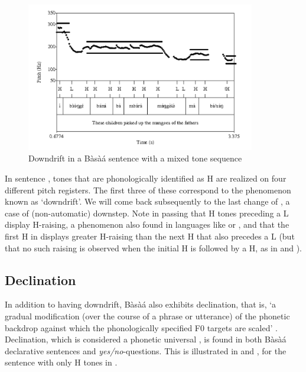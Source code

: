 \documentclass[output=paper,newtxmath,modfonts,nonflat]{langsci/langscibook}
\begin{document}
\begin{figure} 
\includegraphics[width=10cm]{figures/Downdrift}
\caption{Downdrift in a Bàsà{á} sentence with a mixed tone sequence \citep{MakassoEtAl17} \label{fig:HamlaouiMakasso:2}} 
\end{figure}

\noindent In sentence , tones that are phonologically identified as H are realized on four different pitch registers. The first three of these correspond to the phenomenon known as `downdrift'. We will come back subsequently to the last change of , a case of (non-automatic) downstep. Note in passing that H tones preceding a L  display H-raising, a phenomenon also found in languages like  \citep[a.o.][]{ConnellLadd90, Laniran92, LaniranClements03} or  \citep{RiallandSome00, Rialland01}, and that the first H in  displays greater H-raising than the next H that also precedes a L (but that no such raising is observed when the initial H is followed by a H, as in  and ).  


\subsection{Declination}

In addition to having downdrift, Bàsà{á} also exhibits declination, that is, `a gradual modification (over the course of a phrase or utterance) of the phonetic backdrop against which the phonologically specified F$0$ targets are scaled' \citep{ConnellLadd90, Connell11}. Declination, which is considered a phonetic universal \citep{Ladd84, Connell11}, is found in both Bàsà{á} declarative sentences and \emph{yes/no}-questions. This is illustrated in  and , for the sentence with only H tones in  \citep{MakassoEtAl17}.
\end{document}
